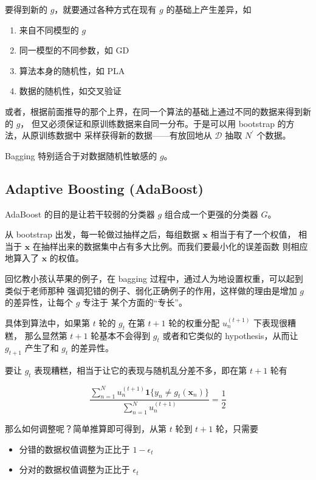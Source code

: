 \documentclass[a4paper]{article}
\begin{document}
要得到新的 $g$，就要通过各种方式在现有 $g$ 的基础上产生差异，如
\begin{enumerate}
  \item 来自不同模型的 $g$ \\
  \item 同一模型的不同参数，如 GD \\
  \item 算法本身的随机性，如 PLA \\
  \item 数据的随机性，如交叉验证 \\
\end{enumerate}

或者，根据前面推导的那个上界，在同一个算法的基础上通过不同的数据来得到新的 $g$，
但又必须保证和原训练数据来自同一分布。于是可以用 bootstrap 的方法，从原训练数据中
采样获得新的数据——有放回地从 $\mathcal{D}$ 抽取 $N^{\prime}$ 个数据。

Bagging 特别适合于对数据随机性敏感的 $g$。


\subsection{Adaptive Boosting (AdaBoost)}
AdaBoost 的目的是让若干较弱的分类器 $g$ 组合成一个更强的分类器 $G$。

从 bootstrap 出发，每一轮做过抽样之后，每组数据 $\mathbf{x}$ 相当于有了一个权值，
相当于 $\mathbf{x}$ 在抽样出来的数据集中占有多大比例。而我们要最小化的误差函数
则相应地算入了 $\mathbf{x}$ 的权值。

回忆教小孩认苹果的例子，在 bagging 过程中，通过人为地设置权重，可以起到类似于老师那种
强调犯错的例子、弱化正确例子的作用，这样做的理由是增加 $g$ 的差异性，让每个 $g$ 专注于
某个方面的“专长”。

具体到算法中，如果第 $t$ 轮的 $g_t$ 在第 $t+1$ 轮的权重分配 $u_n^{(t+1)}$ 下表现很糟糕，
那么显然第 $t+1$ 轮基本不会得到 $g_t$ 或者和它类似的 hypothesis，从而让 $g_{t+1}$ 产生了和 $g_t$
的差异性。

要让 $g_t$ 表现糟糕，相当于让它的表现与随机乱分差不多，即在第 $t+1$ 轮有

$$\frac{\sum_{n=1}^{N}u_n^{(t+1)}\mathbf{1}\{y_n \ne g_t(\mathbf{x}_n)\}}{\sum_{n=1}^{N}u_n^{(t+1)}} = \frac{1}{2}$$

那么如何调整呢？简单推算即可得到，从第 $t$ 轮到 $t+1$ 轮，只需要
\begin{itemize}
  \item 分错的数据权值调整为正比于 $1 - \epsilon_t$
  \item 分对的数据权值调整为正比于 $\epsilon_t$
\end{itemize}
\end{document}

